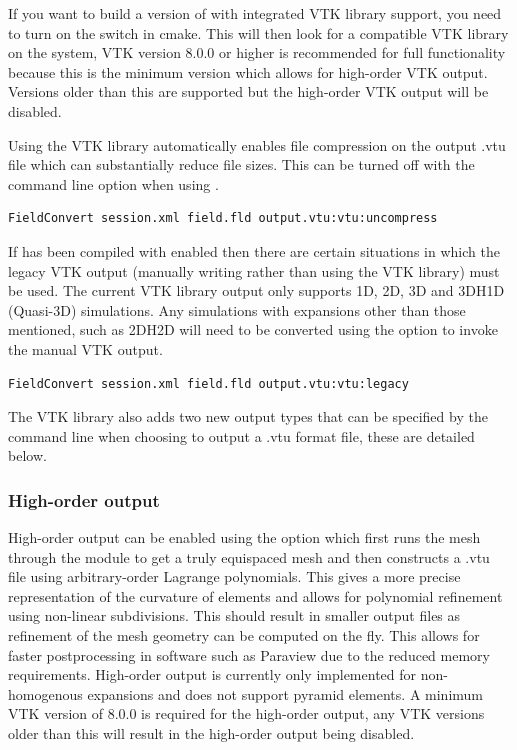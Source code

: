 If you want to build a version of \nekpp with integrated VTK library support, you
need  to turn on the  switch in cmake. This will then
look  for a compatible VTK library on the system, VTK version 8.0.0 or higher is
recommended for full functionality because this is the minimum version which allows
for high-order VTK output. Versions older than this are supported but the high-order
VTK output will be disabled.

Using the  VTK library automatically  enables file compression  on the
output .vtu file  which can substantially reduce file  sizes. This can
be turned  off with  the command  line option   when
using .

\begin{lstlisting}[style=BashInputStyle]
FieldConvert session.xml field.fld output.vtu:vtu:uncompress
\end{lstlisting}

If \nekpp has been compiled with  enabled then there are certain
situations in which the legacy VTK output (manually writing rather than using the
VTK library) must be used. The current VTK library output only supports 1D, 2D, 3D and
3DH1D (Quasi-3D) simulations. Any simulations with expansions other than those mentioned,
such as 2DH2D will need to be converted using the  option to invoke the
manual \nekpp VTK output.

\begin{lstlisting}[style=BashInputStyle]
FieldConvert session.xml field.fld output.vtu:vtu:legacy
\end{lstlisting}

The VTK library also adds two new output types that can be specified by the command
line when choosing to output a .vtu format file, these are detailed below.

\subsubsection{High-order output}
High-order output can be enabled using the option  which first
runs the mesh through the  module to get a truly
equispaced mesh and then constructs a .vtu file using arbitrary-order Lagrange
polynomials. This gives a more precise representation of the curvature of
elements and allows for polynomial refinement using non-linear subdivisions. This
should result in smaller output files as refinement of the mesh geometry can be
computed on the fly. This allows for faster postprocessing in software such as
Paraview due to the reduced memory requirements. High-order output is currently only
implemented for non-homogenous expansions and does not support pyramid elements.
A minimum VTK version of 8.0.0 is required for the high-order output, any VTK versions
older than this will result in the high-order output being disabled.

